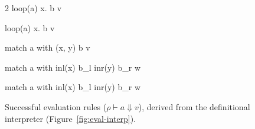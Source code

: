 \begin{figure}[t]
\begin{multicols}{2}
{\rho \vdash \textsf{loop}(a)\; x.\; b \Downarrow v}

{\rho \vdash \textsf{loop}(a)\; x.\; b \Downarrow v}

\end{multicols}

{\rho \vdash \textsf{match}\; a \;\textsf{with}\; (x, y) \Rightarrow b \Downarrow v}

{\rho \vdash \textsf{match}\; a \;\textsf{with}\; \textsf{inl}(x) \Rightarrow b_l \mid \textsf{inr}(y) \Rightarrow b_r \Downarrow w}

{\rho \vdash \textsf{match}\; a \;\textsf{with}\; \textsf{inl}(x) \Rightarrow b_l \mid \textsf{inr}(y) \Rightarrow b_r \Downarrow w}

\vspace{-1em}
\caption{Successful evaluation rules ($\rho \vdash a \Downarrow v$), derived from the definitional interpreter (Figure~\ref{fig:eval-interp}).}\label{fig:eval}
\end{figure}
